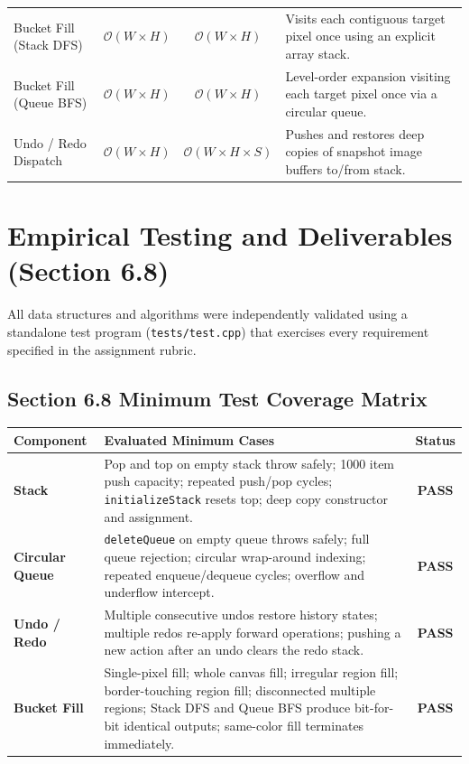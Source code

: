 \documentclass[9.5pt,a4paper]{article}
\begin{document}
\begin{table}[h!]
\begin{tabularx}{\textwidth}{l c c X}
Bucket Fill (Stack DFS) & $\mathcal{O}(W \times H)$ & $\mathcal{O}(W \times H)$ & Visits each contiguous target pixel once using an explicit array stack. \\
Bucket Fill (Queue BFS) & $\mathcal{O}(W \times H)$ & $\mathcal{O}(W \times H)$ & Level-order expansion visiting each target pixel once via a circular queue. \\
Undo / Redo Dispatch & $\mathcal{O}(W \times H)$ & $\mathcal{O}(W \times H \times S)$ & Pushes and restores deep copies of snapshot image buffers to/from stack. \\
\bottomrule
\end{tabularx}
\end{table}

\clearpage


\section{Empirical Testing and Deliverables (Section 6.8)}
All data structures and algorithms were independently validated using a standalone test program (\texttt{tests/test.cpp}) that exercises every requirement specified in the assignment rubric.

\subsection{Section 6.8 Minimum Test Coverage Matrix}
\begin{table}[h!]
\centering
\fontsize{7.5pt}{9.2pt}\selectfont
\begin{tabularx}{\textwidth}{l X c}
\toprule
\textbf{Component} & \textbf{Evaluated Minimum Cases} & \textbf{Status} \\
\midrule
\textbf{Stack} & Pop and top on empty stack throw safely; 1000 item push capacity; repeated push/pop cycles; \texttt{initializeStack} resets top; deep copy constructor and assignment. & \textbf{PASS} \\
\midrule
\textbf{Circular Queue} & \texttt{deleteQueue} on empty queue throws safely; full queue rejection; circular wrap-around indexing; repeated enqueue/dequeue cycles; overflow and underflow intercept. & \textbf{PASS} \\
\midrule
\textbf{Undo / Redo} & Multiple consecutive undos restore history states; multiple redos re-apply forward operations; pushing a new action after an undo clears the redo stack. & \textbf{PASS} \\
\midrule
\textbf{Bucket Fill} & Single-pixel fill; whole canvas fill; irregular region fill; border-touching region fill; disconnected multiple regions; Stack DFS and Queue BFS produce bit-for-bit identical outputs; same-color fill terminates immediately. & \textbf{PASS} \\
\bottomrule
\end{tabularx}
\end{table}
\end{document}
